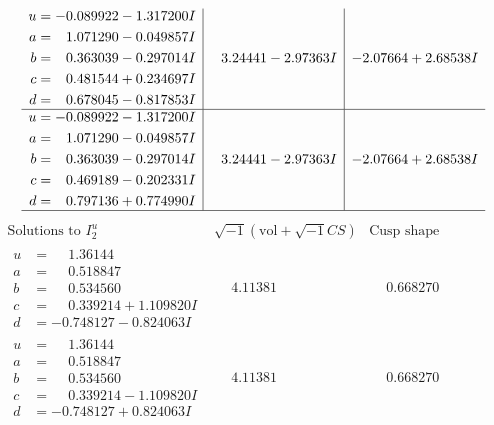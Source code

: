 \documentclass[1p]{elsarticle_modified}
\theoremstyle{definition}
\newcommand{\I}{\sqrt{-1}}
\begin{document}
$$\begin{array}{c|c|c}
\begin{aligned}
u &= -0.089922 - 1.317200 I \\
a &= \phantom{-}1.071290 - 0.049857 I \\
b &= \phantom{-}0.363039 - 0.297014 I \\
c &= \phantom{-}0.481544 + 0.234697 I \\
d &= \phantom{-}0.678045 - 0.817853 I\end{aligned}
 & \phantom{-}3.24441 - 2.97363 I & -2.07664 + 2.68538 I \\ \hline\begin{aligned}
u &= -0.089922 - 1.317200 I \\
a &= \phantom{-}1.071290 - 0.049857 I \\
b &= \phantom{-}0.363039 - 0.297014 I \\
c &= \phantom{-}0.469189 - 0.202331 I \\
d &= \phantom{-}0.797136 + 0.774990 I\end{aligned}
 & \phantom{-}3.24441 - 2.97363 I & -2.07664 + 2.68538 I\\
 \hline 
 \end{array}$$\newpage$$\begin{array}{c|c|c}  
\text{Solutions to }I^u_{2}& \I (\text{vol} + \sqrt{-1}CS) & \text{Cusp shape}\\
 \hline 
\begin{aligned}
u &= \phantom{-}1.36144\phantom{ +0.000000I} \\
a &= \phantom{-}0.518847\phantom{ +0.000000I} \\
b &= \phantom{-}0.534560\phantom{ +0.000000I} \\
c &= \phantom{-}0.339214 + 1.109820 I \\
d &= -0.748127 - 0.824063 I\end{aligned}
 & \phantom{-}4.11381\phantom{ +0.000000I} & \phantom{-}0.668270\phantom{ +0.000000I} \\ \hline\begin{aligned}
u &= \phantom{-}1.36144\phantom{ +0.000000I} \\
a &= \phantom{-}0.518847\phantom{ +0.000000I} \\
b &= \phantom{-}0.534560\phantom{ +0.000000I} \\
c &= \phantom{-}0.339214 - 1.109820 I \\
d &= -0.748127 + 0.824063 I\end{aligned}
 & \phantom{-}4.11381\phantom{ +0.000000I} & \phantom{-}0.668270\phantom{ +0.000000I} \\ \hline\begin{aligned}

\end{aligned}
\end{array}$$
\end{document}
